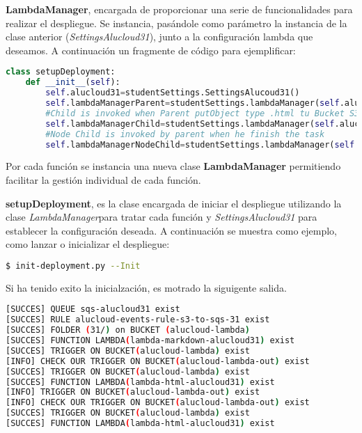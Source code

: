 \documentclass[
]{article}
\begin{document}
\textbf{LambdaManager}, encargada de proporcionar una serie de
funcionalidades para realizar el despliegue. Se instancia, pasándole
como parámetro la instancia de la clase anterior
(\emph{SettingsAlucloud31}), junto a la configuración lambda que
deseamos. A continuación un fragmente de código para ejemplificar:

\begin{lstlisting}[language=Python,caption={Instancias de LambdaManager}]
class setupDeployment:
    def __init__(self):
        self.alucloud31=studentSettings.SettingsAlucoud31()
        self.lambdaManagerParent=studentSettings.lambdaManager(self.alucloud31,self.alucloud31.configParent)
        #Child is invoked when Parent putObject type .html tu Bucket S3
        self.lambdaManagerChild=studentSettings.lambdaManager(self.alucloud31,self.alucloud31.configChild)
        #Node Child is invoked by parent when he finish the task
        self.lambdaManagerNodeChild=studentSettings.lambdaManager(self.alucloud31,self.alucloud31.configChildNode)
\end{lstlisting}

Por cada función se instancia una nueva clase \textbf{LambdaManager}
permitiendo facilitar la gestión individual de cada función.

\textbf{setupDeployment}, es la clase encargada de iniciar el despliegue
utilizando la clase \emph{LambdaManager}para tratar cada función y
\emph{SettingsAlucloud31} para establecer la configuración deseada. A
continuación se muestra como ejemplo, como lanzar o inicializar el
despliegue:

\begin{lstlisting}[language=bash,caption={Iniciar despliegue}]
$ init-deployment.py --Init
\end{lstlisting}

Si ha tenido exito la inicialzación, es motrado la siguigente salida.


\begin{lstlisting}[language=bash,caption={Salida Exitosa}]
[SUCCES] QUEUE sqs-alucloud31 exist
[SUCCES] RULE alucloud-events-rule-s3-to-sqs-31 exist
[SUCCES] FOLDER (31/) on BUCKET (alucloud-lambda)
[SUCCES] FUNCTION LAMBDA(lambda-markdown-alucloud31) exist
[SUCCES] TRIGGER ON BUCKET(alucloud-lambda) exist
[INFO] CHECK OUR TRIGGER ON BUCKET(alucloud-lambda-out) exist
[SUCCES] TRIGGER ON BUCKET(alucloud-lambda) exist
[SUCCES] FUNCTION LAMBDA(lambda-html-alucloud31) exist
[INFO] TRIGGER ON BUCKET(alucloud-lambda-out) exist
[INFO] CHECK OUR TRIGGER ON BUCKET(alucloud-lambda-out) exist
[SUCCES] TRIGGER ON BUCKET(alucloud-lambda) exist
[SUCCES] FUNCTION LAMBDA(lambda-html-alucloud31) exist
\end{lstlisting}
\end{document}
